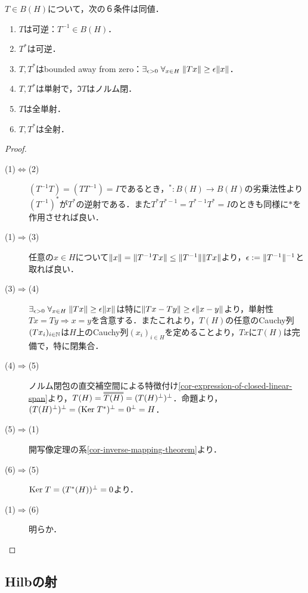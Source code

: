 \documentclass[uplatex,dvipdfmx]{jsreport}
\begin{document}
\begin{proposition}\label{prop-characterization-of-invertibleness-of-operator}
    $T\in B(H)$について，次の６条件は同値．
    \begin{enumerate}
        \item $T$は可逆：$T^{-1}\in B(H)$．
        \item $T^*$は可逆．
        \item $T,T^*$はbounded away from zero：$\exists_{\epsilon>0}\;\forall_{x\in H}\;\|Tx\|\ge\epsilon\|x\|$．%
        \item $T,T^*$は単射で，$\Im T$はノルム閉．
        \item $T$は全単射．
        \item $T,T^*$は全射．
    \end{enumerate}
\end{proposition}
\begin{proof}\mbox{}
    \begin{description}
        \item[(1)$\Leftrightarrow$(2)] $(T^{-1}T)=(TT^{-1})=I$であるとき，${}^*:B(H)\to B(H)$の劣乗法性より$(T^{-1})^*$が$T^*$の逆射である．また$T^*T^{*-1}=T^{*-1}T^*=I$のときも同様に$*$を作用させれば良い．
        \item[(1)$\Rightarrow$(3)] 任意の$x\in H$について$\|x\|=\|T^{-1}Tx\|\le\|T^{-1}\|\|Tx\|$より，$\epsilon:=\|T^{-1}\|^{-1}$と取れば良い．
        \item[(3)$\Rightarrow$(4)] $\exists_{\epsilon>0}\;\forall_{x\in H}\;\|Tx\|\ge\epsilon\|x\|$は特に$\|Tx-Ty\|\ge\epsilon\|x-y\|$より，単射性$Tx=Ty\Rightarrow x=y$を含意する．またこれより，$T(H)$の任意のCauchy列$(Tx_i)_{i\in\mathbb{N}}$は$H$上のCauchy列$(x_i)_{i\in H}$を定めることより，$Tx$に$T(H)$は完備で，特に閉集合．
        \item[(4)$\Rightarrow$(5)] ノルム閉包の直交補空間による特徴付け\ref{cor-expression-of-closed-linear-span}より，$T(H)=\dbloverline{T(H)}=(T(H)^\perp)^\perp$．命題より，$(T(H)^\perp)^\perp=(\mathrm{Ker}\; T^*)^\perp=0^\perp=H$．
        \item[(5)$\Rightarrow$(1)] 開写像定理の系\ref{cor-inverse-mapping-theorem}より．
        \item[(6)$\Rightarrow$(5)] $\mathrm{Ker}\; T=(T^*(H))^\perp=0$より．
        \item[(1)$\Rightarrow$(6)] 明らか．
    \end{description}
\end{proof}

\subsection{Hilbの射}
\end{document}
